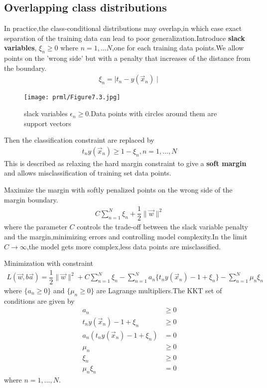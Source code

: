 \subsection{Overlapping class distributions}
In practice,the class-conditional distributions may overlap,in which case exact separation of the training data can lead to poor generalization.Introduce \textbf{slack variables}, $\xi_n\geq 0$ where $n=1,...N$,one for each training data points.We allow points on the 'wrong side' but with a penalty that increases of the distance from the boundary.
\begin{align}
\xi_n = \mid t_n-y(\vec{x}_n)\mid
\end{align}
\begin{SCfigure*}
	\caption{slack variables $\epsilon_n\geq 0$.Data points with circles around them are support vectors}
	\texttt{[image: prml/Figure7.3.jpg]}
\end{SCfigure*}

Then the classification constraint are replaced by
\begin{align}
t_n y(\vec{x}_n) \geq 1-\xi_n,n=1,...,N
\end{align}
This is described as relaxing the hard margin constraint to give a \textbf{soft margin} and allows misclassification of training set data points.

Maximize the margin with softly penalized points on the wrong side of the margin boundary.
\begin{align}
C\sum_{n=1}^{N}\xi_n +\dfrac{1}{2}\parallel\vec{w}\parallel^2
\end{align}
where the parameter $C$ controls the trade-off between the slack variable penalty and the margin,minimizing errors and controlling model complexity.In the limit $C\longrightarrow \infty$,the model gets more complex,less data points are misclassified.

Minimization with constraint
\begin{align}
L(\vec{w},b\vec{a}) =\dfrac{1}{2}\parallel\vec{w}\parallel^2+C\sum_{n=1}^{N}\xi_n-\sum_{n=1}^{N}a_n\{t_n y(\vec{x}_n)-1+\xi_n \} -\sum_{n=1}^{N}\mu_n\xi_n
\end{align}
where $\{a_n\geq 0\}$ and $\{\mu_n \geq 0 \}$ are Lagrange multipliers.The KKT set of conditions are given by
\begin{align}
a_n &\geq 0 \\
t_n y(\vec{x}_n)-1+\xi_n &\geq 0 \\
a_n(t_n y(\vec{x}_n)-1+\xi_n) &= 0 \\
\mu_n &\geq 0 \\
\xi_n &\geq 0 \\
\mu_n\xi_n &=0
\end{align}
where $n=1,...,N$.

